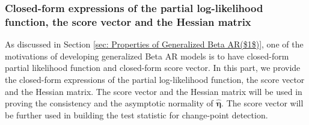 \documentclass{article}
\theoremstyle{definition}
\begin{document}
\subsubsection{Closed-form expressions of the partial log-likelihood function, the score vector and the Hessian matrix}
\label{subsec: Closed-form expressions of the partial log-likelihood function, the score vector and the Hessian matrix}
As discussed in Section \ref{sec: Properties of Generalized Beta AR($1$)}, one of the motivations of developing generalized Beta AR models is to have closed-form partial likelihood function and closed-form score vector. In this part, we provide the closed-form expressions of the partial log-likelihood function, the score vector and the Hessian matrix. The score vector and the Hessian matrix will be used in proving the consistency and the asymptotic normality of $\hat{\bm{\eta}}$. The score vector will be further used in building the test statistic for change-point detection.
\end{document}
